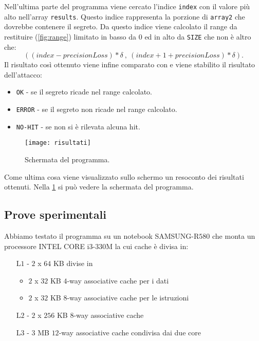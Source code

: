 				Nell'ultima parte del programma viene cercato l'indice \texttt{index} con il valore più alto nell'array \texttt{results}. Questo indice rappresenta la porzione di \texttt{array2} che dovrebbe contenere il segreto. Da questo indice viene calcolato il range da restituire (\cref{fig:range}) limitato in basso da $0$ ed in alto da \texttt{SIZE} che non è altro che: $$((index - precisionLoss) * \delta\ ,\ (index + 1 + precisionLoss) * \delta).$$ Il risultato così ottenuto viene infine comparato con  e viene stabilito il risultato dell'attacco:
				
				\begin{itemize}
					\item \texttt{OK} - se il segreto ricade nel range calcolato.
					\item \texttt{ERROR} - se il segreto non ricade nel range calcolato.
					\item \texttt{NO-HIT} - se non si è rilevata alcuna hit.
				\end{itemize}
			
				\begin{figure}
					\begin{center}
						\texttt{[image: risultati]}
						\caption[Schermata di SPARK]{Schermata del programma.}
						\label{fig:schermata}
					\end{center}
				\end{figure}
				
				Come ultima cosa viene visualizzato sullo schermo un resoconto dei risultati ottenuti. Nella \cref{fig:schermata} si può vedere la schermata del programma.
			
			\subsection{Prove sperimentali}
				Abbiamo testato il programma su un notebook SAMSUNG-R$580$ che monta un processore INTEL CORE i$3$-$330$M la cui cache è divisa in:
				\begin{itemize}
					\item [L$1$ -] $2$ x $64$ KB divise in 
					\begin{itemize}
						\item  $2$ x $32$ KB $4$-way associative cache per i dati
						\item  $2$ x $32$ KB $8$-way associative cache per le istruzioni
					\end{itemize}
					\item[L$2$ -] $2$ x $256$ KB $8$-way associative cache
					\item[L$3$ -] $3$ MB $12$-way associative cache condivisa dai due core
				\end{itemize}
			
